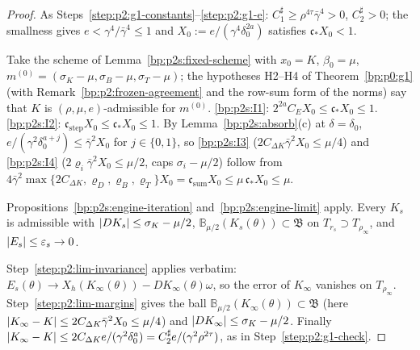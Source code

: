 \begin{proof}
\label{step:p2s:g1-e}
As Steps~\ref{step:p2:g1-constants}--\ref{step:p2:g1-e}: $C_1^\sharp\ge\rho^{4\tau}\bar\gamma^4>0$, $C_2^\sharp>0$; the smallness gives
$e<\gamma^4/\bar\gamma^4\le1$ and $X_0:=e/(\gamma^4\delta_0^{2a})$ satisfies $\mathfrak c_*X_0<1$.

\label{step:p2s:g1-hyp}
Take the scheme of Lemma~\ref{bp:p2s:fixed-scheme} with $x_0=K$, $\beta_0=\mu$, $m^{(0)}=(\sigma_K-\mu,\sigma_B-\mu,\sigma_T-\mu)$; the
hypotheses H2--H4 of Theorem~\ref{bp:p0:g1} (with Remark~\ref{bp:p2:frozen-agreement} and the row-sum form of the norms) say that
$K$ is $(\rho,\mu,e)$-admissible for $m^{(0)}$. \ref{bp:p2s:I1}: $2^{2a}C_EX_0\le\mathfrak c_*X_0\le1$. \ref{bp:p2s:I2}:
$\mathfrak c_{\mathrm{step}}X_0\le\mathfrak c_*X_0\le1$. By Lemma~\ref{bp:p2s:absorb}(c) at $\delta=\delta_0$,
$e/(\gamma^2\delta_0^{a+j})\le\bar\gamma^2X_0$ for $j\in\{0,1\}$, so \ref{bp:p2s:I3} ($2C_{\Delta K}\bar\gamma^2X_0\le\mu/4$) and \ref{bp:p2s:I4}
($2\varrho_i\bar\gamma^2X_0\le\mu/2$, caps $\sigma_i-\mu/2$) follow from
$4\bar\gamma^2\max\{2C_{\Delta K},\varrho_D,\varrho_B,\varrho_T\}X_0=\mathfrak c_{\mathrm{sum}}X_0\le\mu\,\mathfrak c_*X_0\le\mu$.

\label{step:p2s:g1-it}
Propositions~\ref{bp:p2s:engine-iteration} and~\ref{bp:p2s:engine-limit} apply. Every $K_s$ is admissible with
$\lvert DK_s\rvert\le\sigma_K-\mu/2$, $\mathbb B_{\mu/2}(K_s(\theta))\subset\mathfrak B$ on $T_{r_s}\supset T_{\rho_\infty}$, and
$\lvert E_s\rvert\le\varepsilon_s\to0$.

\label{step:p2s:g1-check}
Step~\ref{step:p2:lim-invariance} applies verbatim: $E_s(\theta)\to X_h(K_\infty(\theta))-DK_\infty(\theta)\omega$, so the error of $K_\infty$
vanishes on $T_{\rho_\infty}$. Step~\ref{step:p2:lim-margins} gives the ball $\mathbb B_{\mu/2}(K_\infty(\theta))\subset\mathfrak B$ (here
$\lvert K_\infty-K\rvert\le2C_{\Delta K}\bar\gamma^2X_0\le\mu/4$) and $\lvert DK_\infty\rvert\le\sigma_K-\mu/2$. Finally
$\lvert K_\infty-K\rvert\le2C_{\Delta K}e/(\gamma^2\delta_0^a)=C_2^\sharp e/(\gamma^2\rho^{2\tau})$, as in Step~\ref{step:p2:g1-check}.
\end{proof}

